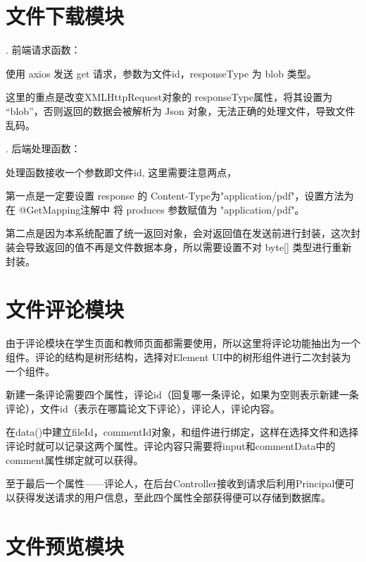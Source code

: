 \section{文件下载模块}

. 前端请求函数：

使用 axios 发送 get 请求，参数为文件id，responseType 为 blob 类型。

这里的重点是改变XMLHttpRequest对象的 responseType属性，将其设置为 “blob”，否则返回的数据会被解析为 Json 对象，无法正确的处理文件，导致文件乱码。

. 后端处理函数：

处理函数接收一个参数即文件id, 这里需要注意两点，

第一点是一定要设置 response 的 Content-Type为"application/pdf"，设置方法为在 @GetMapping注解中 将 produces 参数赋值为 "application/pdf"。

第二点是因为本系统配置了统一返回对象，会对返回值在发送前进行封装，这次封装会导致返回的值不再是文件数据本身，所以需要设置不对 byte[] 类型进行重新封装。

\section{文件评论模块}

由于评论模块在学生页面和教师页面都需要使用，所以这里将评论功能抽出为一个组件。评论的结构是树形结构，选择对Element UI中的树形组件进行二次封装为一个组件。

新建一条评论需要四个属性，评论id（回复哪一条评论，如果为空则表示新建一条评论），文件id（表示在哪篇论文下评论），评论人，评论内容。

在data()中建立fileId，commentId对象，和组件进行绑定，这样在选择文件和选择评论时就可以记录这两个属性。评论内容只需要将input和commentData中的comment属性绑定就可以获得。

至于最后一个属性——评论人，在后台Controller接收到请求后利用Principal便可以获得发送请求的用户信息，至此四个属性全部获得便可以存储到数据库。

\section{文件预览模块}

